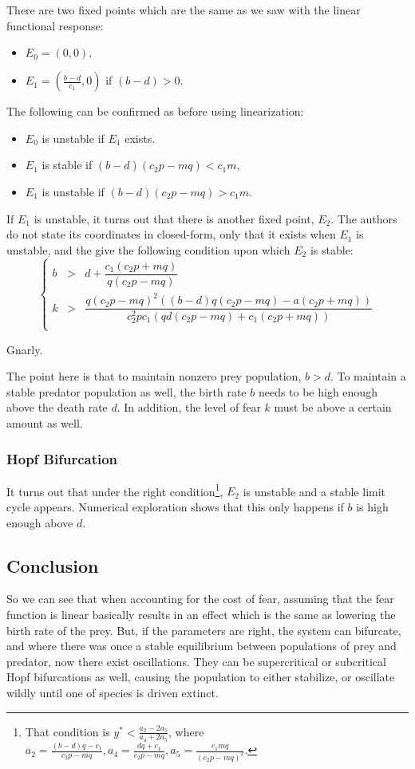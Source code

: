 \documentclass[a5paper]{article}
\theoremstyle{definition}%
\numberwithin{exercise}{section}
\theoremstyle{remark}%
\begin{document}
There are two fixed points which are the same as we saw with the linear functional response:
\begin{itemize}
\item $E_0 = (0,0),$
\item $E_1 = \left(\frac{b-d}{c_1}, 0\right)$ if $(b-d)>0.$
\end{itemize}
The following can be confirmed as before using linearization: 
\begin{itemize}
\item $E_0$ is unstable if $E_1$ exists. 
\item $E_1$ is stable if $(b-d)(c_2p-mq)<c_1m,$
\item $E_1$ is unstable if $(b-d)(c_2p-mq)>c_1m.$
\end{itemize}


If $E_1$ is unstable, it turns out that there is another fixed point, $E_2$. The authors do not state its coordinates in closed-form, only that it exists when $E_1$ is unstable, and the give the following condition upon which $E_2$ is stable:
\[\left\lbrace\begin{array}{rcl}
b&>&d+\dfrac{c_1(c_2p+mq)}{q(c_2p-mq)}\\
k&>&\dfrac{q(c_2p-mq)^2((b-d)q(c_2p-mq)-a(c_2p+mq))}{c_2^2pc_1(qd(c_2p-mq)+c_1(c_2p+mq))}\\
\end{array}\right.\]
\begin{center}
 Gnarly. 
\end{center}
The point here is that to maintain nonzero prey population, $b>d$. To maintain a stable predator population as well, the birth rate $b$ needs to be high enough above the death rate $d$. In addition, the level of fear $k$ must be above a certain amount as well.

\subsubsection*{Hopf Bifurcation}
It turns out that under the right condition\footnote{That condition is $y^*<\frac{a_2-2a_5}{a_4+2a_5}$, where $a_2=\frac{(b-d)q-c_1}{c_2p-mq}, a_4=\frac{dq+c_1}{c_2p-mq}, a_5=\frac{c_1mq}{(c_2p-mq)^2}$.}, $E_2$ is unstable and a stable limit cycle appears. Numerical exploration shows that this only happens if $b$ is high enough above $d$. 

\subsection{Conclusion}
So we can see that when accounting for the cost of fear, assuming that the fear function is linear basically results in an effect which is the same as lowering the birth rate of the prey. But, if the parameters are right, the system can bifurcate, and where there was once a stable equilibrium between populations of prey and predator, now there exist oscillations. They can be supercritical or subcritical Hopf bifurcations as well, causing the population to either stabilize, or oscillate wildly until one of species is driven extinct. 
\end{document}
